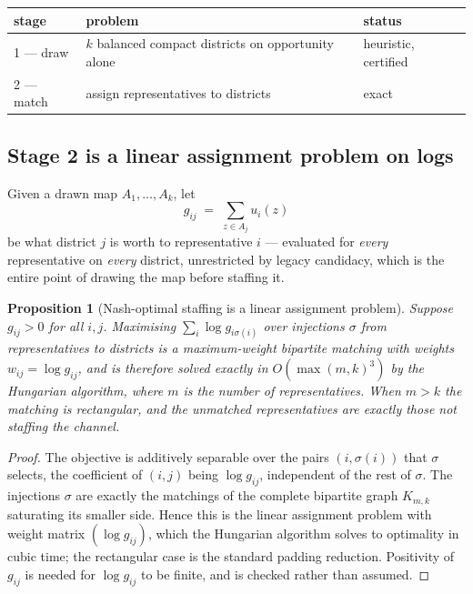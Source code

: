 \documentclass[11pt]{article}
\newtheorem{prop}{Proposition}
\theoremstyle{definition}
\begin{document}
\begin{center}
\begin{tabular}{lll}
\toprule
stage & problem & status\\
\midrule
1 --- draw & $k$ balanced compact districts on opportunity alone & heuristic, certified\\
2 --- match & assign representatives to districts & exact\\
\bottomrule
\end{tabular}
\end{center}

\subsection{Stage 2 is a linear assignment problem on logs}

Given a drawn map $A_1,\dots,A_k$, let
\begin{equation}\label{eq:gij}
g_{ij} \;=\; \sum_{z\in A_j} u_i(z)
\end{equation}
be what district $j$ is worth to representative $i$ --- evaluated for \emph{every}
representative on \emph{every} district, unrestricted by legacy candidacy, which is the
entire point of drawing the map before staffing it.

\begin{prop}[Nash-optimal staffing is a linear assignment problem]\label{prop:hungarian}
Suppose $g_{ij}>0$ for all $i,j$. Maximising $\sum_i \log g_{i\sigma(i)}$ over injections
$\sigma$ from representatives to districts is a maximum-weight bipartite matching with
weights $w_{ij}=\log g_{ij}$, and is therefore solved exactly in $O(\max(m,k)^3)$ by the
Hungarian algorithm, where $m$ is the number of representatives. When $m>k$ the matching
is rectangular, and the unmatched representatives are exactly those not staffing the
channel.
\end{prop}

\begin{proof}
The objective is additively separable over the pairs $(i,\sigma(i))$ that $\sigma$
selects, the coefficient of $(i,j)$ being $\log g_{ij}$, independent of the rest of
$\sigma$. The injections $\sigma$ are exactly the matchings of the complete bipartite
graph $K_{m,k}$ saturating its smaller side. Hence this is the linear assignment problem
with weight matrix $(\log g_{ij})$, which the Hungarian algorithm solves to optimality in
cubic time; the rectangular case is the standard padding reduction. Positivity of $g_{ij}$
is needed for $\log g_{ij}$ to be finite, and is checked rather than assumed.
\end{proof}
\end{document}
